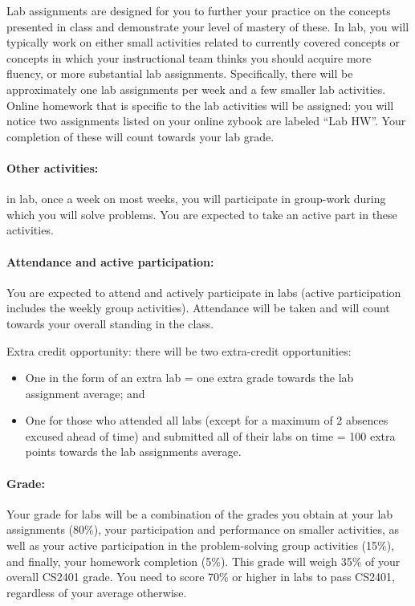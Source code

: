 \documentclass[12pt]{scrartcl}
\newcommand{\change}[2]{#2}
\begin{document}
Lab assignments are designed for you to further your practice on the concepts presented in class and demonstrate your level of mastery of these. 
In lab, you will typically work on either small activities related to currently covered concepts or concepts in which your instructional team thinks you should acquire more fluency, or more substantial lab assignments. 
Specifically, there will be \change{7 or 8 longer}{approximately one} lab assignments \change{}{per week} and a few smaller lab activities. 
Online homework that is specific to the lab activities will be assigned: you will notice two assignments listed on your online zybook are labeled “Lab HW”. 
Your completion of these will count towards your lab grade. 

\paragraph{Other activities:} in lab, once a week on most weeks, you will participate in group-work during which you will solve problems\change{ (offline: at the white board)}. 
You are expected to take an active part in these activities.

\paragraph{Attendance and active participation:} You are expected to attend and actively participate in labs (active participation includes the weekly group activities). 
Attendance will be taken and will count towards your overall standing in the class.

Extra credit opportunity: there will be two extra-credit opportunities: 
\begin{itemize}
\item One in the form of an extra lab = one extra grade towards the lab assignment average; and 
\item One for those who attended all labs (except for a maximum of 2 absences excused ahead of time) and submitted all of their labs on time = 100 extra points towards the lab assignments average.
\end{itemize}

\paragraph{Grade:} Your grade for labs will be a combination of the grades you obtain at your lab assignments (80\%), your participation and performance on smaller activities, as well as your active participation in the problem-solving group activities (15\%), and finally, your homework completion (5\%). 
This grade will weigh 35\% of your overall CS2401 grade. 
You need to score 70\% or higher in labs to pass CS2401, regardless of your average otherwise.
\end{document}
